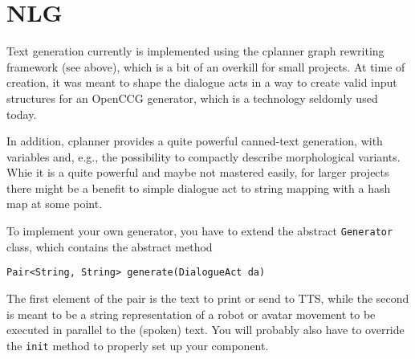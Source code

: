 \section{NLG}

Text generation currently is implemented using the cplanner graph
rewriting framework (see above), which is a bit of an overkill for
small projects. At time of creation, it was meant to shape the
dialogue acts in a way to create valid input structures for an OpenCCG
generator, which is a technology seldomly used today.

In addition, cplanner provides a quite powerful canned-text
generation, with variables and, e.g., the possibility to compactly
describe morphological variants. Whie it is a quite powerful and maybe
not mastered easily, for larger projects there might be a benefit to
simple dialogue act to string mapping with a hash map at some point.

To implement your own generator, you have to extend the abstract
\texttt{Generator} class, which contains the abstract method

\verb|Pair<String, String> generate(DialogueAct da)|

The first element of the pair is the text to print or send to TTS,
while the second is meant to be a string representation of a robot or
avatar movement to be executed in parallel to the (spoken) text. You
will probably also have to override the \texttt{init} method to
properly set up your component.


